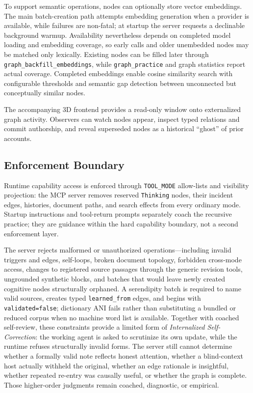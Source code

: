 To support semantic operations, nodes can optionally store vector embeddings. The main batch-creation path attempts embedding generation when a provider is available, while failures are non-fatal; at startup the server requests a declinable background warmup. Availability nevertheless depends on completed model loading and embedding coverage, so early calls and older unembedded nodes may be matched only lexically. Existing nodes can be filled later through \texttt{graph\_backfill\_embeddings}, while \texttt{graph\_practice} and graph statistics report actual coverage. Completed embeddings enable cosine similarity search with configurable thresholds and semantic gap detection between unconnected but conceptually similar nodes.

The accompanying 3D frontend provides a read-only window onto externalized graph activity. Observers can watch nodes appear, inspect typed relations and commit authorship, and reveal superseded nodes as a historical ``ghost'' of prior accounts.

\subsection{Enforcement Boundary}\label{sec:safety-orchestration}

Runtime capability access is enforced through \texttt{TOOL\_MODE} allow-lists and visibility projection: the MCP server removes reserved \texttt{Thinking} nodes, their incident edges, histories, document paths, and search effects from every ordinary mode. Startup instructions and tool-return prompts separately coach the recursive practice; they are guidance within the hard capability boundary, not a second enforcement layer.

The server rejects malformed or unauthorized operations---including invalid triggers and edges, self-loops, broken document topology, forbidden cross-mode access, changes to registered source passages through the generic revision tools, ungrounded synthetic blocks, and batches that would leave newly created cognitive nodes structurally orphaned. A serendipity batch is required to name valid sources, creates typed \texttt{learned\_from} edges, and begins with \texttt{validated=false}; dictionary ANI fails rather than substituting a bundled or reduced corpus when no machine word list is available. Together with coached self-review, these constraints provide a limited form of \emph{Internalized Self-Correction}: the working agent is asked to scrutinize its own update, while the runtime refuses structurally invalid forms. The server still cannot determine whether a formally valid note reflects honest attention, whether a blind-context host actually withheld the original, whether an edge rationale is insightful, whether repeated re-entry was causally useful, or whether the graph is complete. Those higher-order judgments remain coached, diagnostic, or empirical.

